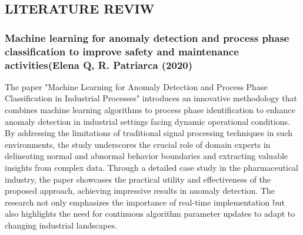 \documentclass[12pt]{report}
\begin{document}
\subsection*{\centering LITERATURE  REVIW}
\setcounter{section}{2} %
\setcounter{subsection}{-1}
\par
\subsubsection{Machine learning for anomaly detection and process phase
classification to improve safety and maintenance activities(Elena Q, R. Patriarca (2020)}
The paper "Machine Learning for Anomaly Detection and Process Phase Classification in Industrial Processes" \cite{ml_paper1} introduces an innovative methodology that combines machine learning algorithms to process phase identification to enhance anomaly detection in industrial settings facing dynamic operational conditions. By addressing the limitations of traditional signal processing techniques in such environments, the study underscores the crucial role of domain experts in delineating normal and abnormal behavior boundaries and extracting valuable insights from complex data. Through a detailed case study in the pharmaceutical industry, the paper showcases the practical utility and effectiveness of the proposed approach, achieving impressive results in anomaly detection. The research not only emphasizes the importance of real-time implementation but also highlights the need for continuous algorithm parameter updates to adapt to changing industrial landscapes.
\end{document}
